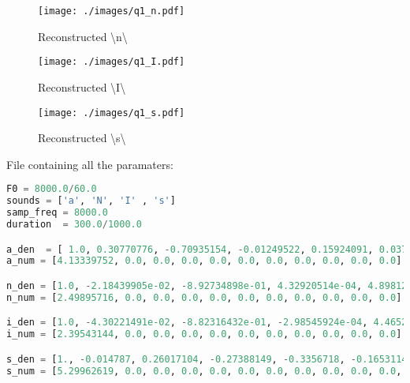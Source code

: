 \documentclass[a4paper]{article}
\begin{document}
\begin{figure}[h!]
    \texttt{[image: ./images/q1\_n.pdf]}
    \caption{Reconstructed \textbackslash n\textbackslash}
    \label{fig:1}
\end{figure}

\begin{figure}[h!]
    \texttt{[image: ./images/q1\_I.pdf]}
    \caption{Reconstructed \textbackslash I\textbackslash}
    \label{fig:1}
\end{figure}

\begin{figure}[h!]
    \texttt{[image: ./images/q1\_s.pdf]}
    \caption{Reconstructed \textbackslash s\textbackslash}
    \label{fig:1}
\end{figure}




File containing all the paramaters:
\begin{lstlisting}[language=Python, caption=params.py]
F0 = 8000.0/60.0
sounds = ['a', 'N', 'I' , 's'] 
samp_freq = 8000.0
duration  = 300.0/1000.0

a_den  = [ 1.0, 0.30770776, -0.70935154, -0.01249522, 0.15924091, 0.03700667, 0.15999816, -0.03421146, -0.09653191, -0.25471351, -0.03752092]
a_num = [4.13339752, 0.0, 0.0, 0.0, 0.0, 0.0, 0.0, 0.0, 0.0, 0.0, 0.0]

n_den = [1.0, -2.18439905e-02, -8.92734898e-01, 4.32920514e-04, 4.89812545e-04, 4.89186592e-04, 4.88165983e-04, 4.86755417e-04, 4.86350841e-04, 2.22938139e-02, 6.37348443e-02]
n_num = [2.49895716, 0.0, 0.0, 0.0, 0.0, 0.0, 0.0, 0.0, 0.0, 0.0, 0.0]

i_den = [1.0, -4.30221491e-02, -8.82316432e-01, -2.98545924e-04, 4.46520736e-04, 4.46443384e-04, 4.45346265e-04, 4.44658817e-04, 1.39040245e-03, 9.07980247e-02, -1.67148707e-02]
i_num = [2.39543144, 0.0, 0.0, 0.0, 0.0, 0.0, 0.0, 0.0, 0.0, 0.0, 0.0]

s_den = [1., -0.014787, 0.26017104, -0.27388149, -0.3356718, -0.16531149, -0.04300548, 0.17950459, -0.03551942, -0.08449707, -0.05001272, -0.08581098, 0.0386388, -0.10588742, 0.01688407, -0.04029857, -0.00275163, -0.05118139, -0.13576579, -0.03593119, -0.0137991]
s_num = [5.29962619, 0.0, 0.0, 0.0, 0.0, 0.0, 0.0, 0.0, 0.0, 0.0, 0.0, 0.0, 0.0, 0.0, 0.0, 0.0, 0.0, 0.0, 0.0, 0.0, 0.0]
\end{lstlisting}
\end{document}
